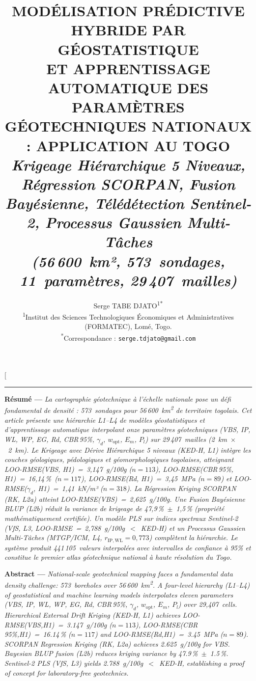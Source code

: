 \documentclass[10pt,a4paper,twocolumn]{article}
\title{%
  \vspace{-1.4cm}%
  \fontsize{13}{15}\bfseries%
  MODÉLISATION PRÉDICTIVE HYBRIDE PAR GÉOSTATISTIQUE\\
  ET APPRENTISSAGE AUTOMATIQUE DES PARAMÈTRES\\
  GÉOTECHNIQUES NATIONAUX : APPLICATION AU TOGO\\[4pt]
  {\fontsize{10.5}{13}\normalfont\itshape
    Krigeage Hiérarchique 5 Niveaux, Régression SCORPAN, Fusion Bayésienne,
    Télédétection Sentinel-2, Processus Gaussien Multi-Tâches\\
    (56\,600~km², 573~sondages, 11~paramètres, 29\,407~mailles)}%
}
\author{%
  \fontsize{10}{12}\normalfont
  Serge TABE DJATO\textsuperscript{1*}\\[3pt]
  \fontsize{9}{11}\normalfont
  \textsuperscript{1}Institut des Sciences Technologiques Économiques et Administratives
  (FORMATEC), Lomé, Togo.\\
  \textsuperscript{*}Correspondance : \texttt{serge.tdjato@gmail.com}
}
\date{}
\begin{document}
\twocolumn[%
  \maketitle
  \vspace{-0.5cm}
  \rule{\linewidth}{0.4pt}
  \vspace{0.15cm}

  \noindent\small
  \textbf{Résumé ---} \textit{%
    La cartographie géotechnique à l'échelle nationale pose un défi fondamental
    de densité : 573~sondages pour 56\,600~km\textsuperscript{2} de territoire togolais.
    Cet article présente une hiérarchie L1--L4 de modèles géostatistiques et
    d'apprentissage automatique interpolant onze paramètres géotechniques
    (VBS, IP, WL, WP, EG, Rd, CBR\,95\%, $\gamma_d$, $w_{\mathrm{opt}}$, $E_m$, $P_l$)
    sur 29\,407~mailles (2~km~$\times$~2~km).
    Le Krigeage avec Dérive Hiérarchique 5 niveaux (KED-H, L1) intègre les couches
    géologiques, pédologiques et géomorphologiques togolaises,
    atteignant LOO-RMSE(VBS, H1)~=~3{,}147~g/100g ($n=113$),
    LOO-RMSE(CBR\,95\%, H1)~=~16{,}14\,\%~($n=117$),
    LOO-RMSE(Rd, H1)~=~3{,}45~MPa ($n=89$) et
    LOO-RMSE($\gamma_d$, H1)~=~1{,}41~kN/m³ ($n=318$).
    La Régression Kriging SCORPAN (RK, L2a) atteint LOO-RMSE(VBS)~=~2{,}625~g/100g.
    Une Fusion Bayésienne BLUP (L2b) réduit la variance de krigeage de
    47{,}9\,\%~$\pm$~1{,}5\,\% (propriété mathématiquement certifiée).
    Un modèle PLS sur indices spectraux Sentinel-2 (VfS, L3,
    LOO-RMSE~=~2{,}788~g/100g~$<$~KED-H) et un Processus Gaussien
    Multi-Tâches (MTGP/ICM, L4, $r_{\mathrm{IP,WL}}=0{,}773$) complètent
    la hiérarchie. Le système produit 441\,105~valeurs interpolées
    avec intervalles de confiance à 95\% et constitue le premier atlas
    géotechnique national à haute résolution du Togo.%
  }

  \smallskip
  \noindent\small
  \textbf{Abstract ---} \textit{%
    National-scale geotechnical mapping faces a fundamental data density challenge:
    573~boreholes over 56\,600~km\textsuperscript{2}.
    A four-level hierarchy (L1--L4) of geostatistical and machine learning models
    interpolates eleven parameters (VBS, IP, WL, WP, EG, Rd, CBR\,95\%,
    $\gamma_d$, $w_{\mathrm{opt}}$, $E_m$, $P_l$) over 29,407~cells.
    Hierarchical External Drift Kriging (KED-H, L1) achieves
    LOO-RMSE(VBS,H1)~=~3.147~g/100g ($n=113$),
    LOO-RMSE(CBR\,95\%,H1)~=~16.14\,\% ($n=117$) and
    LOO-RMSE(Rd,H1)~=~3.45~MPa ($n=89$).
    SCORPAN Regression Kriging (RK, L2a) achieves 2.625~g/100g for VBS.
    Bayesian BLUP fusion (L2b) reduces kriging variance by 47.9\,\%~$\pm$~1.5\,\%.
    Sentinel-2 PLS (VfS, L3) yields 2.788~g/100g~$<$~KED-H,
    establishing a proof of concept for laboratory-free geotechnics.%
  }
\end{document}
